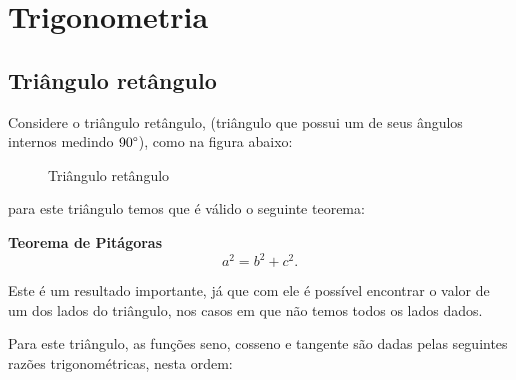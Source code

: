 
\chapter{Trigonometria}

 \section{Triângulo retângulo}

  Considere o triângulo retângulo, (triângulo que possui um de seus ângulos internos medindo $90 \degree$), como na figura abaixo:
  \begin{figure}[H]
   \centering
   \caption{Triângulo retângulo}
  \end{figure}
 para este triângulo temos que é válido o seguinte teorema:

 \vskip0.3cm

\colorbox{azul}{
 \begin{minipage}{0.9\linewidth}
 \begin{center}
 \textbf{Teorema de Pitágoras}
\begin{equation}
a^2= b^2 + c^2.
\end{equation}
 \end{center}
 \end{minipage}}

 \vskip0.3cm

 Este é um resultado importante, já que com ele é possível encontrar o valor de um dos lados do triângulo, nos casos em que não temos todos os lados dados.

 Para este triângulo, as funções seno, cosseno e tangente são dadas pelas seguintes razões trigonométricas, nesta ordem:


